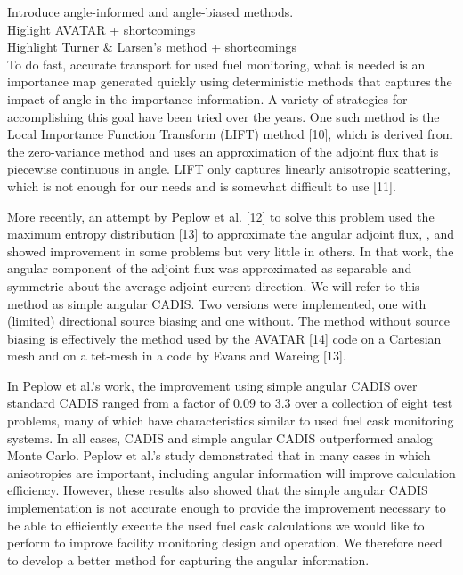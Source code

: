 \documentclass[12pt]{article}
\begin{document}
Introduce angle-informed and angle-biased methods. \\
Higlight AVATAR + shortcomings \\
Highlight Turner \& Larsen's method + shortcomings\\

To do fast, accurate transport for used fuel monitoring, what is needed is an importance map generated quickly using deterministic methods that captures the impact of angle in the importance information. A variety of strategies for accomplishing this goal have been tried over the years. One such method is the Local Importance Function Transform (LIFT) method [10], which is derived from the zero-variance method and  uses an approximation of the adjoint flux that is piecewise continuous in angle. LIFT only captures linearly anisotropic scattering, which is not enough for our needs and is somewhat difficult to use [11].

More recently, an attempt by Peplow et al. [12] to solve this problem used the maximum entropy distribution [13] to approximate the angular adjoint flux, , and showed improvement in some problems but very little in others. In that work, the angular component of the adjoint flux was approximated as separable and symmetric about the average adjoint current direction. We will refer to this method as simple angular CADIS. Two versions were implemented, one with (limited) directional source biasing and one without. The method without source biasing is effectively the method used by the AVATAR [14] code on a Cartesian mesh and on a tet-mesh in a code by Evans and Wareing [13]. 

In Peplow et al.’s work, the improvement using simple angular CADIS over standard CADIS ranged from a factor of 0.09 to 3.3 over a collection of eight test problems, many of which have characteristics similar to used fuel cask monitoring systems. In all cases, CADIS and simple angular CADIS outperformed analog Monte Carlo. Peplow et al.’s study demonstrated that in many cases in which anisotropies are important, including angular information will improve calculation efficiency. However, these results also showed that the simple angular CADIS implementation is not accurate enough to provide the improvement necessary to be able to efficiently execute the used fuel cask calculations we would like to perform to improve facility monitoring design and operation. We therefore need to develop a better method for capturing the angular information.  
	
\end{document}
